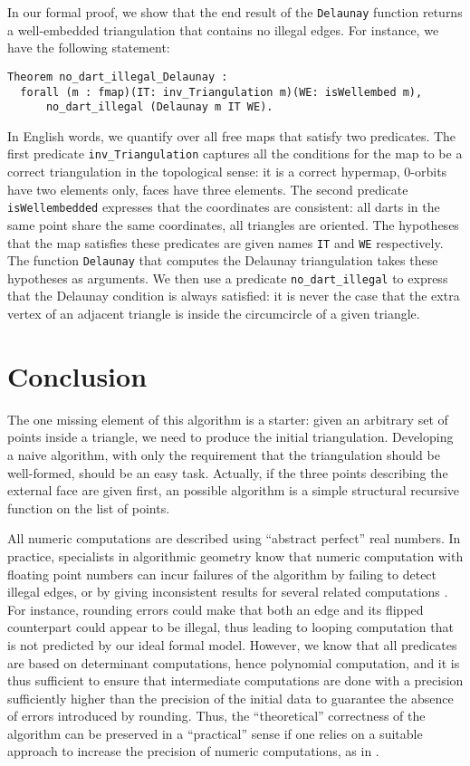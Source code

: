 \documentclass{llncs}
\begin{document}
In our formal proof, we show that the end result of the {\tt Delaunay}
function returns a well-embedded triangulation that contains no illegal
edges.  For instance, we have the following statement:

\begin{verbatim}
Theorem no_dart_illegal_Delaunay : 
  forall (m : fmap)(IT: inv_Triangulation m)(WE: isWellembed m),  
      no_dart_illegal (Delaunay m IT WE). 
\end{verbatim}
In English words, we quantify over all free maps that satisfy two
predicates.  The first predicate {\tt inv\_Triangulation} captures all
the conditions for the map to be a correct triangulation in the
topological sense: it is a correct hypermap, 0-orbits have two
elements only, faces have three elements.  The second predicate
{\tt isWellembedded}
expresses that the coordinates are consistent: all darts in the same point
share the same coordinates, all triangles are oriented.  The hypotheses
that the map satisfies these predicates are given names {\tt IT} and {\tt WE}
respectively.  The function {\tt Delaunay}
that computes the Delaunay triangulation takes
these hypotheses as arguments.  We then use a predicate {\tt no\_dart\_illegal}
to express that the Delaunay condition is always satisfied: it is never the
case that the extra vertex of an adjacent triangle is inside the circumcircle
of a given triangle.

\section{Conclusion}
\label{CL}
The one missing element of this algorithm is a starter: given an arbitrary set
of points inside a triangle, we need to produce the initial triangulation.
Developing a naive algorithm, with only the requirement that the triangulation
should be well-formed, should be an easy task.  Actually, if the three points
describing the external face are given first, an possible algorithm is
a simple structural recursive function on the list of points.

All numeric computations are described using ``abstract perfect'' real
numbers.  In practice, specialists in algorithmic geometry know that numeric
computation with floating point numbers can incur failures of the algorithm
by failing to detect illegal edges, or by giving inconsistent results for
several related computations \cite{yp06,ket08}.  For instance, rounding errors
could make that
both an edge and its flipped counterpart could appear to be illegal, thus
leading to looping computation that is not predicted by our ideal formal model.
However, we know that all predicates are based on determinant computations,
hence polynomial computation, and it is thus sufficient to ensure that
intermediate computations are done with a precision sufficiently higher than
the precision of the initial data to guarantee the absence of errors
introduced by rounding.  Thus, the ``theoretical'' correctness of the algorithm
can be preserved in a ``practical'' sense if one relies on a suitable
approach to increase the precision of numeric computations, as in \cite{mel:pio,pri91,Fou07}.
\end{document}
